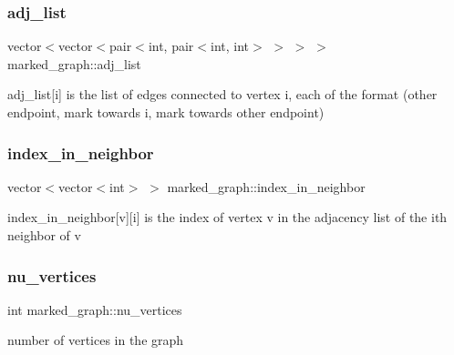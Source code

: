\subsubsection{\texorpdfstring{adj\+\_\+list}{adj\_list}}
{\footnotesize\ttfamily vector$<$vector$<$pair$<$int, pair$<$int, int$>$ $>$ $>$ $>$ marked\+\_\+graph\+::adj\+\_\+list}



adj\+\_\+list\mbox{[}i\mbox{]} is the list of edges connected to vertex i, each of the format (other endpoint, mark towards i, mark towards other endpoint) 

\mbox{\label{classmarked__graph_aee10b537408de42476609c1e45c075d0}} 
\subsubsection{\texorpdfstring{index\+\_\+in\+\_\+neighbor}{index\_in\_neighbor}}
{\footnotesize\ttfamily vector$<$vector$<$int$>$ $>$ marked\+\_\+graph\+::index\+\_\+in\+\_\+neighbor}



index\+\_\+in\+\_\+neighbor\mbox{[}v\mbox{]}\mbox{[}i\mbox{]} is the index of vertex v in the adjacency list of the ith neighbor of v 

\mbox{\label{classmarked__graph_acf79c6aeb8f32614cb14a5baaa6c9f9b}} 
\subsubsection{\texorpdfstring{nu\+\_\+vertices}{nu\_vertices}}
{\footnotesize\ttfamily int marked\+\_\+graph\+::nu\+\_\+vertices}



number of vertices in the graph 

\mbox{\label{classmarked__graph_ac83e9377dd4d8bb95be1ac949b127296}} 
